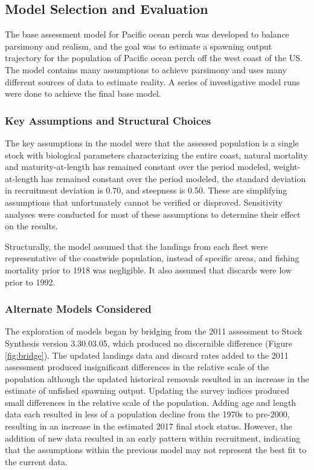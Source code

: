 \documentclass[12pt,]{article}
\begin{document}
\subsection{Model Selection and
Evaluation}\label{model-selection-and-evaluation}

The base assessment model for Pacific ocean perch was developed to
balance parsimony and realism, and the goal was to estimate a spawning
output trajectory for the population of Pacific ocean perch off the west
coast of the US. The model contains many assumptions to achieve
parsimony and uses many different sources of data to estimate reality. A
series of investigative model runs were done to achieve the final base
model.

\subsubsection{Key Assumptions and Structural
Choices}\label{key-assumptions-and-structural-choices}

The key assumptions in the model were that the assessed population is a
single stock with biological parameters characterizing the entire coast,
natural mortality and maturity-at-length has remained constant over the
period modeled, weight-at-length has remained constant over the period
modeled, the standard deviation in recruitment deviation is 0.70, and
steepness is 0.50. These are simplifying assumptions that unfortunately
cannot be verified or disproved. Sensitivity analyses were conducted for
most of these assumptions to determine their effect on the results.

Structurally, the model assumed that the landings from each fleet were
representative of the coastwide population, instead of specific areas,
and fishing mortality prior to 1918 was negligible. It also assumed that
discards were low prior to 1992.

\subsubsection{Alternate Models
Considered}\label{alternate-models-considered}

The exploration of models began by bridging from the 2011 assessment to
Stock Synthesis version 3.30.03.05, which produced no discernible
difference (Figure \ref{fig:bridge}). The updated landings data and
discard rates added to the 2011 assessment produced insignificant
differences in the relative scale of the population although the updated
historical removals resulted in an increase in the estimate of unfished
spawning output. Updating the survey indices produced small differences
in the relative scale of the population. Adding age and length data each
resulted in less of a population decline from the 1970s to pre-2000,
resulting in an increase in the estimated 2017 final stock status.
However, the addition of new data resulted in an early pattern within
recruitment, indicating that the assumptions within the previous model
may not represent the best fit to the current data.
\end{document}
